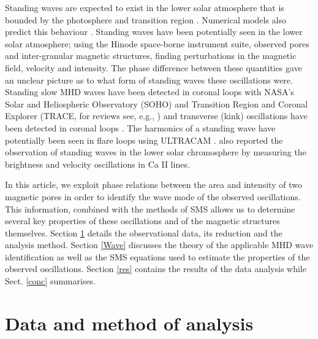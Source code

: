     Standing waves are expected to exist in the lower solar atmosphere that is bounded by the photosphere and transition region \citep{mein,leibacher}. Numerical models also predict this behaviour \citep{zhugzhda1,erdelyi,malins}.
    Standing waves have been potentially seen in the lower solar atmosphere; using the Hinode space-borne instrument suite, \citet{PMHDW} observed pores and inter-granular magnetic structures, finding perturbations in the magnetic field, velocity and intensity.
    The phase difference between these quantities gave an unclear picture as to what form of standing waves these oscillations were.
    Standing slow MHD waves have been detected in coronal loops with NASA's Solar and Heliospheric Observatory (SOHO) and Transition Region and Coronal Explorer (TRACE, for reviews see, e.g., \citealp{wang2011standing,2012RSPTA.370.3193D}) and transverse (kink) oscillations have been detected in coronal loops \citep[e.g][for a review see \citealp{Andries2009,Ruderman2009}]{1999ApJ520880A,taroyan,oshea,2008ApJ...687L..45V}.
    The harmonics of a standing wave have potentially been seen in flare loops using ULTRACAM \citep[e.g.,][]{mathioudakis}.
    \citet{fleck} also reported the observation of standing waves in the lower solar chromosphere by measuring the  brightness and velocity oscillations in Ca II lines. 
    
    In this article, we exploit phase relations between the area and intensity of two magnetic pores in order to identify the wave mode of the observed oscillations.
    This information, combined with the methods of SMS allows us to determine several key properties of these oscillations and  of the magnetic structures themselves.
    Section \ref{DnA} details the observational data, its reduction and the analysis method.
    Section \ref{Wave} discusses the theory of the applicable MHD wave identification as well as the SMS equations used to estimate the properties of the observed oscillations.
    Section \ref{res} contains the results of the data analysis while Sect. \ref{conc} summarises.  
    
\section{Data and method of analysis}
\label{DnA}

